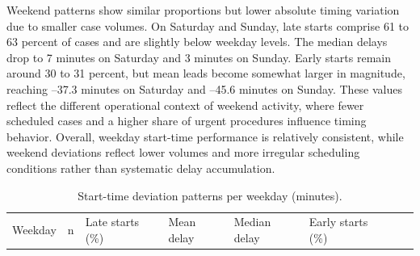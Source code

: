 \documentclass[
]{article}
\begin{document}
Weekend patterns show similar proportions but lower absolute timing
variation due to smaller case volumes. On Saturday and Sunday, late
starts comprise 61 to 63 percent of cases and are slightly below weekday
levels. The median delays drop to 7 minutes on Saturday and 3 minutes on
Sunday. Early starts remain around 30 to 31 percent, but mean leads
become somewhat larger in magnitude, reaching --37.3 minutes on Saturday
and --45.6 minutes on Sunday. These values reflect the different
operational context of weekend activity, where fewer scheduled cases and
a higher share of urgent procedures influence timing behavior. Overall,
weekday start-time performance is relatively consistent, while weekend
deviations reflect lower volumes and more irregular scheduling
conditions rather than systematic delay accumulation.

\begin{longtable}[]{@{}
  >{\centering\arraybackslash}p{}
  >{\centering\arraybackslash}p{}
  >{\centering\arraybackslash}p{}
  >{\centering\arraybackslash}p{}
  >{\centering\arraybackslash}p{}
  >{\centering\arraybackslash}p{}
  >{\centering\arraybackslash}p{}
  >{\centering\arraybackslash}p{}@{}}
\caption{Start-time deviation patterns per weekday (minutes).
\label{tab:start_diff_weekday}}\tabularnewline
\toprule\noalign{}
\begin{minipage}[b]{\linewidth}\centering
Weekday
\end{minipage} & \begin{minipage}[b]{\linewidth}\centering
n
\end{minipage} & \begin{minipage}[b]{\linewidth}\centering
Late starts (\%)
\end{minipage} & \begin{minipage}[b]{\linewidth}\centering
Mean delay
\end{minipage} & \begin{minipage}[b]{\linewidth}\centering
Median delay
\end{minipage} & \begin{minipage}[b]{\linewidth}\centering
Early starts (\%)
\end{minipage} & \begin{minipage}[b]{\linewidth}\centering

\end{minipage}
\end{longtable}
\end{document}
